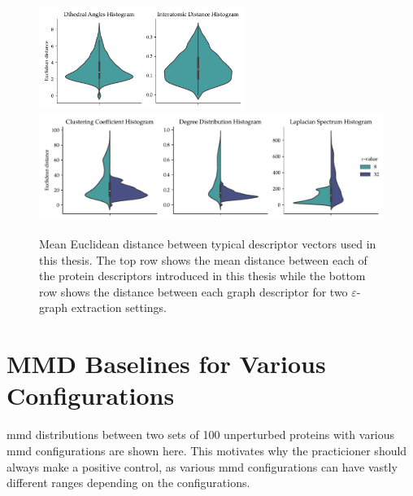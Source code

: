 \begin{figure}
  \centering
  \includegraphics[width=0.6\textwidth]{./figures/results/violin_protein_descriptors.pdf}
  \includegraphics[width=\textwidth]{./figures/results/violin_graph_descriptors.pdf}
  \caption[Mean Euclidean distance between typical descriptor vectors used in
  this thesis]{Mean Euclidean distance between typical descriptor vectors used in
this thesis. The top row shows the mean distance between each of the protein
descriptors introduced in this thesis while the bottom row shows the distance
between each graph descriptor for two $\varepsilon$-graph extraction settings.}
  \label{fig:mean_distance_embedding}
\end{figure}

\clearpage
\section{MMD Baselines for Various Configurations}\label{sec:mmd_baselines}

\acrshort{mmd} distributions between two sets of 100 unperturbed proteins with
various \acrshort{mmd} configurations are shown here. This motivates why the
practicioner should always make a positive control, as various \acrshort{mmd}
configurations can have vastly different ranges depending on the configurations.

